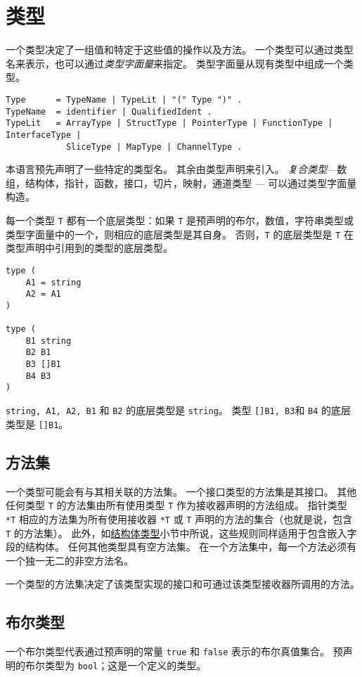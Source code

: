 \chapter{类型}
一个类型决定了一组值和特定于这些值的操作以及方法。
一个类型可以通过类型名来表示，也可以通过\emph{类型字面量}来指定。
类型字面量从现有类型中组成一个类型。

\begin{lstlisting}[style=EBNF]
Type      = TypeName | TypeLit | "(" Type ")" .
TypeName  = identifier | QualifiedIdent .
TypeLit   = ArrayType | StructType | PointerType | FunctionType | InterfaceType |
			SliceType | MapType | ChannelType .
\end{lstlisting}

本语言预先声明了一些特定的类型名。
其余由类型声明来引入。
\emph{复合类型}---数组，结构体，指针，函数，接口，切片，映射，通道类型 --- 可以通过类型字面量构造。

每一个类型 \lstinline|T| 都有一个底层类型：如果 \lstinline|T| 是预声明的布尔，数值，字符串类型或类型字面量中的一个，则相应的底层类型是其自身。
否则，\lstinline|T| 的底层类型是 \lstinline|T| 在类型声明中引用到的类型的底层类型。
\begin{lstlisting}[style=golang]
type (
	A1 = string
	A2 = A1
)

type (
	B1 string
	B2 B1
	B3 []B1
	B4 B3
)
\end{lstlisting}
\lstinline|string, A1, A2, B1| 和 \lstinline|B2| 的底层类型是 \lstinline|string|。
类型 \lstinline|[]B1, B3|和 \lstinline|B4| 的底层类型是 \lstinline|[]B1|。


\section{方法集}
一个类型可能会有与其相关联的方法集。
一个接口类型的方法集是其接口。
其他任何类型 \lstinline|T| 的方法集由所有使用类型 \lstinline|T| 作为接收器声明的方法组成。
指针类型 \lstinline|*T| 相应的方法集为所有使用接收器 \lstinline|*T| 或 \lstinline|T| 声明的方法的集合（也就是说，包含 \lstinline|T| 的方法集）。
此外，如\hyperref[sec:struct-type]{结构体类型}小节中所说，这些规则同样适用于包含嵌入字段的结构体。
任何其他类型具有空方法集。
在一个方法集中，每一个方法必须有一个独一无二的非空方法名。

一个类型的方法集决定了该类型实现的接口和可通过该类型接收器所调用的方法。

\section{布尔类型}
一个布尔类型代表通过预声明的常量 \lstinline|true| 和 \lstinline|false| 表示的布尔真值集合。
预声明的布尔类型为 \lstinline|bool|；这是一个定义的类型。


